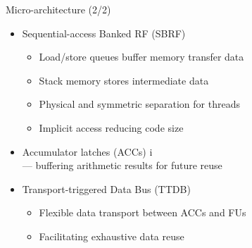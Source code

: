 \documentclass{beamer}
\begin{document}
\begin{CJK}{UTF8}{bkai}
    \begin{frame}{Micro-architecture (2/2)}
        \begin{itemize}
            \item Sequential-access Banked RF (SBRF)
                \begin{itemize}
                    \item Load/store queues buffer memory transfer data
                    \item Stack memory stores intermediate data
                    \item Physical and symmetric separation for threads
                    \item Implicit access reducing code size
                \end{itemize}
            \item Accumulator latches (ACCs) i\\ --- buffering arithmetic results for future reuse
            \item Transport-triggered Data Bus (TTDB)
                \begin{itemize}
                    \item Flexible data transport between ACCs and FUs
                    \item Facilitating exhaustive data reuse
                \end{itemize}
        \end{itemize}
    \end{frame}


\end{CJK}
\end{document}
